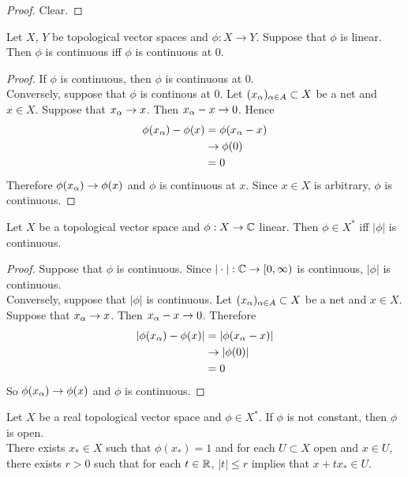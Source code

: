 \documentclass{book}
\begin{document}
	\begin{proof}
		Clear.
	\end{proof}

	\begin{ex}
		Let $X$, $Y$ be topological vector spaces and $\phi:X \rightarrow Y$. Suppose that $\phi$ is linear. Then $\phi$ is continuous iff $\phi$ is continuous at $0$.
	\end{ex}
	
	\begin{proof}
		If $\phi$ is continuous, then $\phi$ is continuous at $0$.\\
		Conversely, suppose that $\phi$ is continous at $0$. Let $(x_{\alpha})_{\alpha \in A} \subset X$ be a net and $x \in X$. Suppose that $x_{\alpha} \rightarrow x$. Then $x_{\alpha} - x \rightarrow 0$. Hence 
		\begin{align*}
			\phi(x_{\alpha}) - \phi(x) 
			&= \phi(x_{\alpha} - x) \\
			&\rightarrow \phi(0) \\
			&= 0
		\end{align*}
		Therefore $\phi(x_{\alpha}) \rightarrow \phi(x)$ and $\phi$ is continuous at $x$. Since $x \in X$ is arbitrary, $\phi$ is continuous. 
	\end{proof}

\begin{ex}
	Let $X$ be a topological vector space and $\phi :X \rightarrow \mathbb{C}$ linear. Then $\phi \in X^*$ iff $|\phi|$ is continuous. 
\end{ex}

\begin{proof}
	Suppose that $\phi$ is continuous. Since  $|\cdot|:\mathbb{C} \rightarrow [0,\infty)$ is continuous, $|\phi|$ is continuous. \\
	Conversely, suppose that $|\phi|$ is continuous. Let $(x_{\alpha})_{\alpha \in A} \subset X$ be a net and $x \in X$. Suppose that $x_{\alpha} \rightarrow x$. Then $x_{\alpha} - x \rightarrow 0$. Therefore 
	\begin{align*}
		|\phi(x_{\alpha}) - \phi(x)| 
		&= |\phi(x_{\alpha} - x)| \\
		& \rightarrow |\phi(0)| \\
		&= 0
	\end{align*} 
	So $\phi(x_{\alpha}) \rightarrow \phi(x)$ and $\phi$ is continuous.
\end{proof}

	\begin{ex}
		Let $X$ be a real topological vector space and $\phi \in X^*$. If $\phi$ is not constant, then $\phi$ is open. \\
		 There exists $x_* \in X$  such that $\phi(x_*) = 1$ and for each $U \subset X$ open and $x \in U$, there exists $r >0$ such that for each $t \in \mathbb{R}$, $|t| \leq r$ implies that $x + tx_* \in U$. 
	\end{ex}
	
\end{document}
